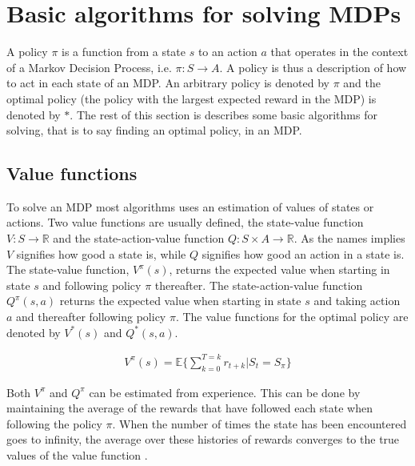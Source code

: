 \section{Basic algorithms for solving MDPs}

A policy $\pi$ is a function from a state $s$ to an action $a$ that operates in
the context of a Markov Decision Process, i.e. $\pi \colon S \to A$. A policy
is thus a description of how to act in each state of an MDP. An arbitrary
policy is denoted by $\pi$ and the optimal policy (the policy with the largest
expected reward in the MDP) is denoted by $*$. The rest of this section is
describes some basic algorithms for solving, that is to say finding an optimal
policy, in an MDP.

\subsection{Value functions}

To solve an MDP most algorithms uses an estimation of values of states or
actions. Two value functions are usually defined, the state-value function $V :
S \to \mathbb R$ and the state-action-value function $Q : S \times A \to
\mathbb R$. As the names implies $V$ signifies how good a state is, while $Q$
signifies how good an action in a state is. The state-value function,
$V^\pi(s)$, returns the expected value when starting in state $s$ and following
policy $\pi$ thereafter. The state-action-value function $Q^\pi(s, a)$ returns
the expected value when starting in state $s$ and taking action $a$ and
thereafter following policy $\pi$. The value functions for the optimal policy
are denoted by $V^*(s)$ and $Q^*(s, a)$. 

\begin{align}
\label{equation:v_finite}
V^\pi(s) = \mathbb{E} \{ \sum_{k=0}^{T=k} r_{t+k} | S_t = S_\pi \}
\end{align}

Both $V^\pi$ and $Q^\pi$ can be estimated from experience. This can be done by
maintaining the average of the rewards that have followed each state when
following the policy $\pi$. When the number of times the state has been
encountered goes to infinity, the average over these histories of rewards
converges to the true values of the value function
\parencite{barto1998reinforcement}.






